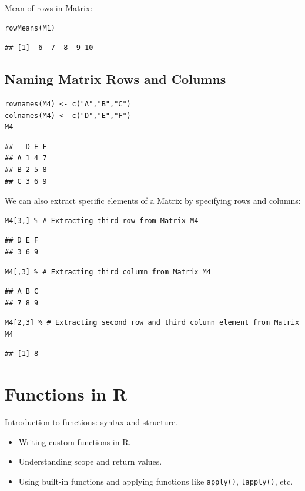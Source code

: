 \documentclass[12pt]{book}
\begin{document}
Mean of rows in Matrix:
\begin{verbatim}
rowMeans(M1)
\end{verbatim}
\begin{verbatim}
## [1]  6  7  8  9 10
\end{verbatim}

\subsection{Naming Matrix Rows and Columns}
\begin{verbatim}
rownames(M4) <- c("A","B","C")
colnames(M4) <- c("D","E","F")
M4
\end{verbatim}
\begin{verbatim}
##   D E F
## A 1 4 7
## B 2 5 8
## C 3 6 9
\end{verbatim}

We can also extract specific elements of a Matrix by specifying rows and columns:

\begin{verbatim}
M4[3,] % # Extracting third row from Matrix M4
\end{verbatim}
\begin{verbatim}
## D E F 
## 3 6 9
\end{verbatim}
\begin{verbatim}
M4[,3] % # Extracting third column from Matrix M4
\end{verbatim}
\begin{verbatim}
## A B C 
## 7 8 9
\end{verbatim}
\begin{verbatim}
M4[2,3] % # Extracting second row and third column element from Matrix M4
\end{verbatim}
\begin{verbatim}
## [1] 8
\end{verbatim}










\section{Functions in R}
Introduction to functions: syntax and structure.
\begin{itemize}
    \item Writing custom functions in R.
    \item Understanding scope and return values.
    \item Using built-in functions and applying functions like \texttt{apply()}, \texttt{lapply()}, etc.
\end{itemize}
\end{document}

